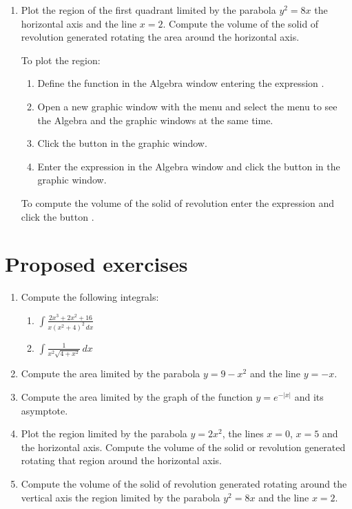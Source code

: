 \begin{enumerate}[leftmargin=*]
\item Plot the region of the first quadrant limited by the parabola $y^2=8x$ the horizontal axis and the line $x=2$. 
Compute the volume of the solid of revolution generated rotating the area around the horizontal axis. 
\begin{indication}
To plot the region:
\begin{enumerate}
\item Define the function in the Algebra window entering the expression .
\item Open a new graphic window with the menu  and select the menu  to see the Algebra and the graphic windows at the same time.
\item Click the button  in the graphic window.
\item Enter the expression  in the Algebra window and click the button  in the graphic window.
\end{enumerate}
To compute the volume of the solid of revolution enter the expression  and click the button .
\end{indication}

\end{enumerate}


\section{Proposed exercises}
\begin{enumerate}[leftmargin=*]
\item Compute the following integrals:
\begin{enumerate}
\item $\displaystyle \int \frac{2x^3+2x^2+16}{x(x^2+4)^2\,dx}$
\item $\displaystyle \int \frac{1}{x^2\sqrt{4+x^2}}\,dx$
\end{enumerate}

\item Compute the area limited by the parabola $y=9-x^2$ and the line $y=-x$.

\item Compute the area limited by the graph of the function $y=e^{-|x|}$ and its asymptote.

\item Plot the region limited by the parabola $y=2x^2$, the lines $x=0$, $x=5$ and the horizontal axis. 
Compute the volume of the solid or revolution generated rotating that region around the horizontal axis.

\item Compute the volume of the solid of revolution generated rotating around the vertical axis the region limited by the parabola $y^2=8x$ and the line $x=2$.
\end{enumerate}
